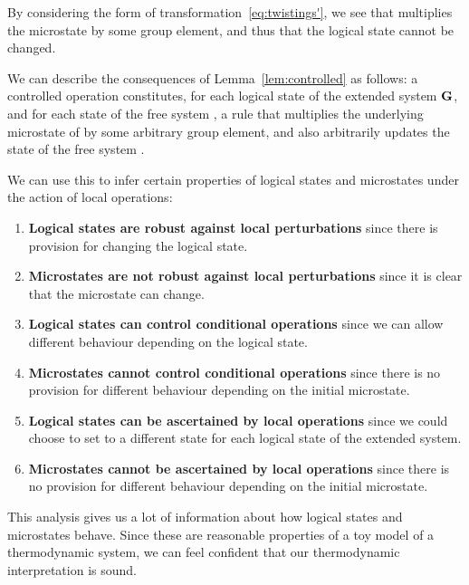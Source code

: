 \documentclass[a4paper,12pt]{article}
\theoremstyle{definition}
\newcommand\cat[1]{{\ensuremath{\bf #1}}}
\renewcommand{\-}[0]{\nobreakdash-\hspace{0pt}}
\begin{document}
\noindent
By considering the form of transformation~\eqref{eq:twistings'}, we see that  multiplies the microstate by some group element, and thus that the logical state cannot be changed.

We can describe the consequences of Lemma~\ref{lem:controlled} as follows: a controlled operation constitutes, for each logical state  of the extended system \cat G, and for each state of the free system , a rule that multiplies the underlying microstate of  by some arbitrary group element, and also arbitrarily updates the state of the free system .

We can use this to infer certain properties of logical states and microstates under the action of local operations:
\begin{enumerate}[label=(\arabic*)]
\item \textbf{Logical states are robust against  local perturbations} since there is provision for changing the logical state.

\item \textbf{Microstates are not robust against local perturbations} since it is clear that the microstate can change.

\item \textbf{Logical states can control conditional operations} since we can allow different behaviour depending on the logical state.

\item \textbf{Microstates cannot control conditional operations} since there is no provision for different behaviour depending on the initial microstate.

\item \textbf{Logical states can be ascertained by local operations} since we could choose to set  to a different state for each logical state of the extended system.

\item \textbf{Microstates cannot be ascertained by local operations} since there is no provision for different behaviour depending on the initial microstate.
\end{enumerate}

\noindent
This analysis gives us a lot of information about how logical states and microstates behave. Since these are reasonable properties of a toy model of a thermodynamic system, we can feel confident that our thermodynamic interpretation is sound.

\end{document}

